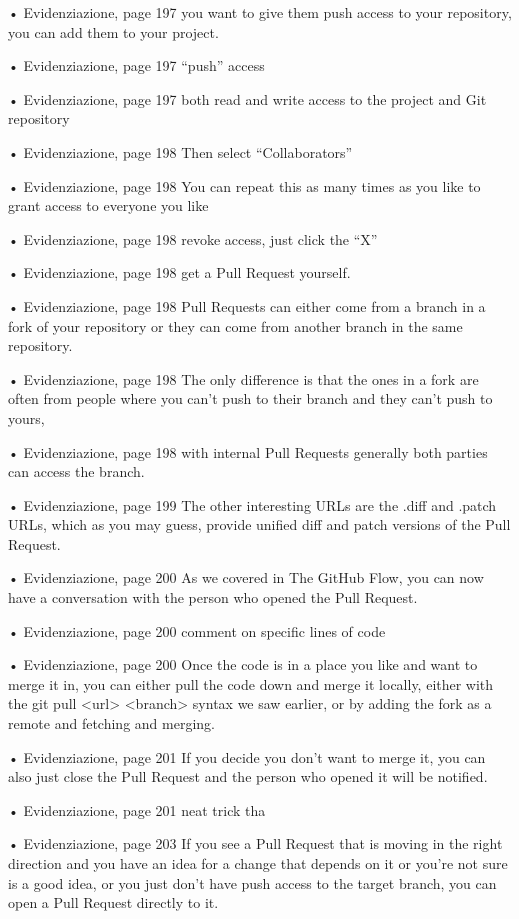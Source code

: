 • Evidenziazione, page 197
you want to give them push access to your repository, you can add them to your project.

• Evidenziazione, page 197
“push” access

• Evidenziazione, page 197
both read and write access to the project and Git repository

• Evidenziazione, page 198
Then select “Collaborators”

• Evidenziazione, page 198
You can repeat this as many times as you like to grant access to everyone you like

• Evidenziazione, page 198
revoke access, just click the “X”

• Evidenziazione, page 198
get a Pull Request yourself.

• Evidenziazione, page 198
Pull Requests can either come from a branch in a fork of your repository or they can come from another branch in the same repository.

• Evidenziazione, page 198
The only difference is that the ones in a fork are often from people where you can’t push to their branch and they can’t push to yours,

• Evidenziazione, page 198
with internal Pull Requests generally both parties can access the branch.

• Evidenziazione, page 199
The other interesting URLs are the .diff and .patch URLs, which as you may guess, provide unified diff and patch versions of the Pull Request.

• Evidenziazione, page 200
As we covered in The GitHub Flow, you can now have a conversation with the person who opened the Pull Request.

• Evidenziazione, page 200
comment on specific lines of code

• Evidenziazione, page 200
Once the code is in a place you like and want to merge it in, you can either pull the code down and merge it locally, either with the git pull <url> <branch> syntax we saw earlier, or by adding the fork as a remote and fetching and merging.

• Evidenziazione, page 201
If you decide you don’t want to merge it, you can also just close the Pull Request and the person who opened it will be notified.

• Evidenziazione, page 201
neat trick tha

• Evidenziazione, page 203
If you see a Pull Request that is moving in the right direction and you have an idea for a change that depends on it or you’re not sure is a good idea, or you just don’t have push access to the target branch, you can open a Pull Request directly to it.

